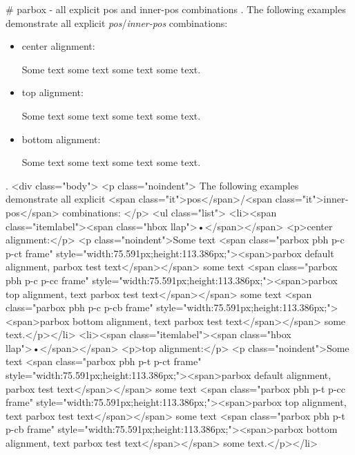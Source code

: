 #
parbox - all explicit pos and inner-pos combinations
.
\noindent
The following examples demonstrate all explicit \emph{pos}/\emph{inner-pos} combinations:
\begin{itemize}
\item center alignment:

\noindent
Some text
some text
some text
some text.

\item top alignment:

\noindent
Some text
some text
some text
some text.

\item bottom alignment:

\noindent
Some text
some text
some text
some text.
\end{itemize}
.
<div class="body">
<p class="noindent">
The following examples demonstrate all explicit <span class="it">pos</span>/<span class="it">inner‐pos</span> combinations:
</p>
<ul class="list">
<li><span class="itemlabel"><span class="hbox llap">•</span></span>
<p>center alignment:</p>
<p class="noindent">Some text <span class="parbox pbh p-c p-ct frame" style="width:75.591px;height:113.386px;"><span>parbox default alignment, parbox test text</span></span> some text <span class="parbox pbh p-c p-cc frame" style="width:75.591px;height:113.386px;"><span>parbox top alignment, text parbox test text</span></span> some text <span class="parbox pbh p-c p-cb frame" style="width:75.591px;height:113.386px;"><span>parbox bottom alignment, text parbox test text</span></span> some text.</p></li>
<li><span class="itemlabel"><span class="hbox llap">•</span></span>
<p>top alignment:</p>
<p class="noindent">Some text <span class="parbox pbh p-t p-ct frame" style="width:75.591px;height:113.386px;"><span>parbox default alignment, parbox test text</span></span> some text <span class="parbox pbh p-t p-cc frame" style="width:75.591px;height:113.386px;"><span>parbox top alignment, text parbox test text</span></span> some text <span class="parbox pbh p-t p-cb frame" style="width:75.591px;height:113.386px;"><span>parbox bottom alignment, text parbox test text</span></span> some text.</p></li>
